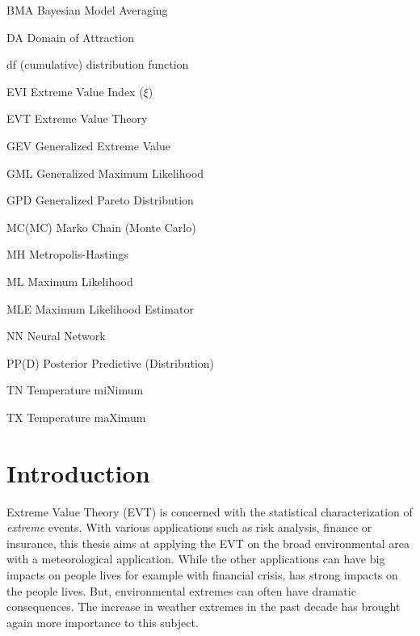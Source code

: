 \documentclass[11pt,a4paper,openany, twosided]{book}
\newcommand{\abbrlabel}[1]{\makebox[3cm][l]{\textbf{#1}\ \dotfill}}
\newenvironment{abbreviations}{\begin{list}{}{\renewcommand{\makelabel}{\abbrlabel}}}{\end{list}}
\newcommand\blankpage{%
    \null
    \thispagestyle{empty}%
    \addtocounter{page}{-1}%
    \newpage}
\begin{document}
\begin{center}
\begin{abbreviations}
	\item[BMA] Bayesian Model Averaging
	\item[DA] Domain of Attraction
	\item[df]\label{df}  (cumulative) distribution function
	\item[EVI] Extreme Value Index ($\xi$)
	\item[EVT] Extreme Value Theory
	\item[GEV] Generalized Extreme Value
	\item[GML] Generalized Maximum Likelihood
	\item[GPD] Generalized Pareto Distribution %
	\item[MC(MC)] Marko Chain (Monte Carlo)
	\item[MH] Metropolis-Hastings 
	\item[ML] Maximum Likelihood 
	\item[MLE] Maximum Likelihood Estimator
	\item[NN] Neural Network
	\item[PP(D)] Posterior Predictive (Distribution)
	\item[TN] Temperature miNimum
	\item[TX] Temperature maXimum
	
\end{abbreviations}
\end{center}


\renewcommand\labelitemi{\normalsize$\bullet$}



\afterpage{\blankpage}


\chapter*{Introduction}
\thispagestyle{empty}


Extreme Value Theory (EVT) is concerned with the statistical characterization of \emph{extreme} events. 
With various applications such as risk analysis, finance or insurance, this thesis aims at applying the EVT on the broad environmental area with a meteorological application. While the other applications can have big impacts on people lives for example with financial crisis, has strong impacts on the people lives. But, environmental extremes can often have dramatic consequences.
The increase in weather extremes in the past decade has brought again more importance to this subject.
\end{document}

